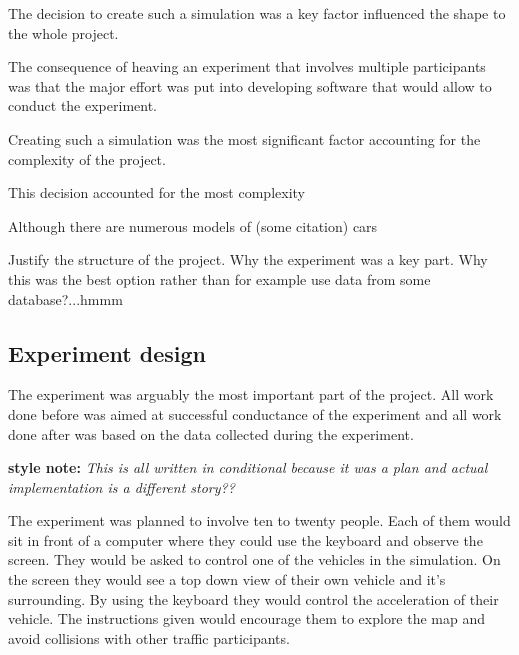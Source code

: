 \documentclass[11pt]{article}
\begin{document}
The decision to create such a simulation was a key factor influenced the shape to the whole project. 


The consequence of heaving an experiment that involves multiple participants was that the major effort was put into developing software that would allow to conduct the experiment.  



Creating such a simulation was the most significant factor accounting for the complexity of the project. 



This decision accounted for the most complexity 



Although there are numerous models of (some citation) cars 


Justify the structure of the project. Why the experiment was a key part. Why this was
the best option rather than for example use data from some database?...hmmm

\subsection{Experiment design}
The experiment was arguably the most important part of the project. All work done before was aimed at successful conductance of the experiment and all work done after was based on the data collected during the experiment. 


\textbf{style note:} \textit{This is all written in conditional because it was a plan and actual implementation is a different story??}

The experiment was planned to involve ten to twenty people. Each of them would sit in front of a computer where they could use the keyboard and observe the screen. They would be asked to control one of the vehicles in the simulation. On the screen they would see a top down view of their own vehicle and it's surrounding. By using the keyboard they would control the acceleration of their vehicle.
The instructions given would encourage them to explore the map and avoid collisions with other traffic participants.
\end{document}

